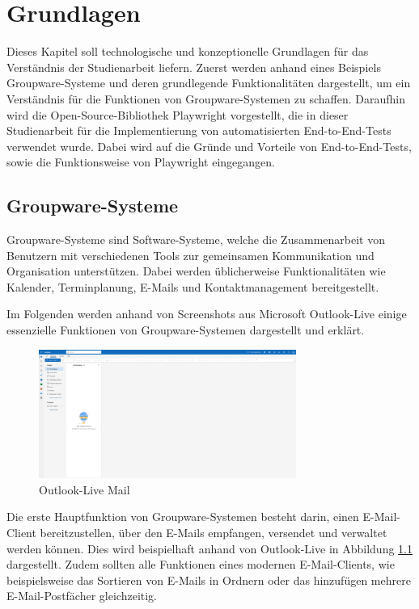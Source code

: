 \chapter{Grundlagen}

Dieses Kapitel soll technologische und konzeptionelle Grundlagen für das Verständnis der Studienarbeit liefern.
Zuerst werden anhand eines Beispiels Groupware-Systeme und deren grundlegende Funktionalitäten dargestellt, um ein Verständnis für die Funktionen von Groupware-Systemen zu schaffen.
Daraufhin wird die Open-Source-Bibliothek Playwright vorgestellt, die in dieser Studienarbeit für die Implementierung von automatisierten End-to-End-Tests verwendet wurde.
Dabei wird auf die Gründe und Vorteile von End-to-End-Tests, sowie die Funktionsweise von Playwright eingegangen.

\section{Groupware-Systeme}

Groupware-Systeme sind Software-Systeme, welche die Zusammenarbeit von Benutzern mit verschiedenen Tools zur gemeinsamen Kommunikation und Organisation unterstützen.
Dabei werden üblicherweise Funktionalitäten wie Kalender, Terminplanung, E-Mails und Kontaktmanagement bereitgestellt.

Im Folgenden werden anhand von Screenshots aus Microsoft Outlook-Live einige essenzielle Funktionen von Groupware-Systemen dargestellt und erklärt.
\begin{figure}[H]
    \centering
    \includegraphics[width=0.75\textwidth]{images/OutlookLive_Mail1.png}
    \caption{Outlook-Live Mail}
    \label{fig:outlook-live-mail}
\end{figure}
Die erste Hauptfunktion von Groupware-Systemen besteht darin, einen E-Mail-Client bereitzustellen, über den E-Mails empfangen, versendet und verwaltet werden können. Dies wird beispielhaft anhand von Outlook-Live in Abbildung \ref{fig:outlook-live-mail} dargestellt.
Zudem sollten alle Funktionen eines modernen E-Mail-Clients, wie beispielsweise das Sortieren von E-Mails in Ordnern oder das hinzufügen mehrere E-Mail-Postfächer gleichzeitig.


